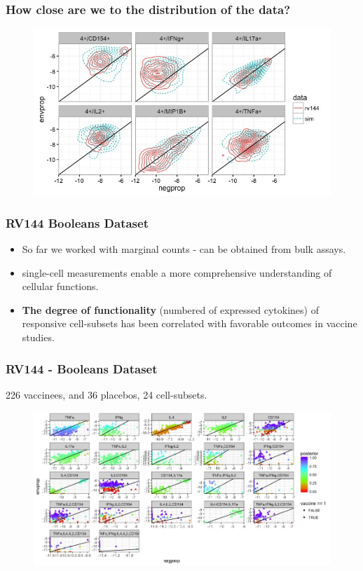 \documentclass{beamer}
\theoremstyle{definition}
\begin{document}
\begin{frame}
\frametitle{How close are we to the distribution of the data?}
\begin{figure}[]
\includegraphics[width=12 cm]{figures/simVsRealContour} 
\end{figure}
\end{frame}


\begin{frame}
\frametitle{RV144 Booleans Dataset}
\begin{itemize}
\item So far we worked with marginal counts - can be obtained from bulk assays. 
\pause
\vspace{0.8 cm}
\item single-cell measurements enable a more comprehensive understanding of cellular functions. 
\vspace{0.8 cm}
\item  \textbf{The degree of functionality} (numbered of expressed cytokines) of responsive cell-subsets has been correlated with favorable outcomes in vaccine studies. 
\end{itemize}
\end{frame}


\begin{frame}
\frametitle{RV144 - Booleans Dataset}
226 vaccinees, and 36 placebos, 24 cell-subsets.
\begin{figure}[]
\includegraphics[width=13.2 cm]{figures/booleansFullScatter}
\end{figure}
\end{frame}
\end{document}
